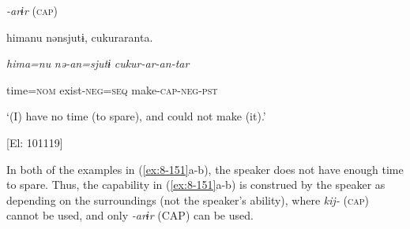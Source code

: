 \ex \textit{{}-arɨr} (\textsc{cap})

  {\TM}
\glll  himanu  nənsjutɨ,  cukuraranta.

    \textit{hima=nu}  \textit{nə-an=sjutɨ}  \textit{cukur-ar{}-an-tar}

    time=\textsc{nom}  exist-\textsc{neg}=\textsc{seq}  make-\textsc{cap}-\textsc{neg}-\textsc{pst}

    ‘(I) have no time (to spare), and could not make (it).’

    [El: 101119]

In both of the examples in (\ref{ex:8-151}a-b), the speaker does not have enough time to spare. Thus, the capability in (\ref{ex:8-151}a-b) is construed by the speaker as depending on the surroundings (not the speaker’s ability), where \textit{kij-} (\textsc{cap}) cannot be used, and only \textit{{}-arɨr} (CAP) can be used.
